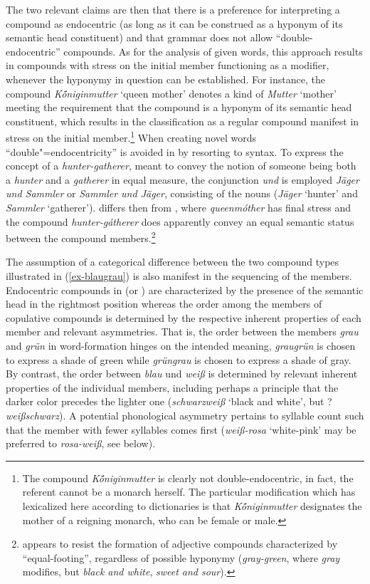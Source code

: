\documentclass[output=paper
 ,nobabel
 ,draftmode
 ,colorlinks, citecolor=brown
]{langscibook}
\begin{document}
The two relevant claims are then that there is a preference for interpreting a compound as endocentric (as long as it can be construed as a hyponym of its semantic head constituent) and that  grammar does not allow ``double-endocentric'' compounds.
As for the analysis of given words, this approach results in compounds with stress on the initial member functioning as a modifier, whenever the hyponymy in question can be established. For instance, the compound \emph{Kö́niginmutter} `queen mother' denotes a kind of \emph{Mutter} `mother' meeting the requirement that the compound is a hyponym of its semantic head constituent, which results in the classification as a regular compound manifest in stress on the initial member.\footnote{The compound \emph{Kö́niginmutter} is clearly not double-endocentric, in fact, the referent cannot be a monarch herself. The particular modification which has lexicalized here according to dictionaries is that \emph{Kö́niginmutter} designates the mother of a reigning monarch, who can be female or male.} When creating novel words ``double"=endocentricity'' is avoided in  by resorting to syntax. To express the concept of a \emph{hunter-gatherer}, meant to convey the notion of someone being both a \emph{hunter} and a \emph{gatherer} in equal measure, the conjunction \emph{und} is employed \emph{Jäger und Sammler} or \emph{Sammler und Jäger}, consisting of the nouns (\emph{Jäger} `hunter' and \emph{Sammler} `gatherer').  differs then from , where \emph{queenmóther} has final stress and the compound \emph{hunter-gátherer} does apparently convey an equal semantic status between the compound members.\footnote{ appears to resist the formation of adjective compounds characterized by ``equal-footing'', regardless of possible hyponymy (\eg \emph{gray-green}, where \emph{gray} modifies, but \emph{black and white}, \emph{sweet and sour}).}

The assumption of a categorical difference between the two compound types illustrated in
(\ref{ex-blaugrau}) is also manifest in the sequencing of the members. Endocentric compounds in
 (or ) are characterized by the presence of the semantic head in the rightmost position
whereas the order among the members of copulative compounds is determined by the respective inherent
properties of each member and relevant asymmetries. That is, the order between the members
\emph{grau} and \emph{grün} in word-formation hinges on the intended meaning, \emph{graugrün} is
chosen to express a shade of green while \emph{grüngrau} is chosen to express a shade of gray. By
contrast, the order between \emph{blau} und \emph{weiß} is determined by relevant inherent
properties of the individual members, including perhaps a principle that the darker color precedes
the lighter one (\emph{schwarzweiß} `black and white', but ?\emph{weißschwarz}). A potential
phonological asymmetry pertains to syllable count such that the member with fewer syllables comes
first (\eg \emph{weiß-rosa} `white-pink' may be preferred to \emph{rosa-weiß}, see below).
\end{document}
